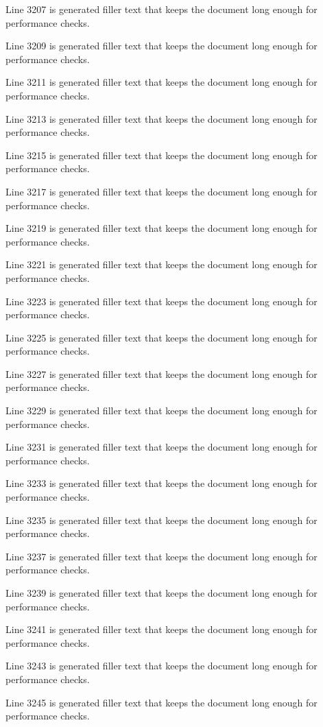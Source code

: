 Line 3207 is generated filler text that keeps the document long enough for performance checks.

Line 3209 is generated filler text that keeps the document long enough for performance checks.

Line 3211 is generated filler text that keeps the document long enough for performance checks.

Line 3213 is generated filler text that keeps the document long enough for performance checks.

Line 3215 is generated filler text that keeps the document long enough for performance checks.

Line 3217 is generated filler text that keeps the document long enough for performance checks.

Line 3219 is generated filler text that keeps the document long enough for performance checks.

Line 3221 is generated filler text that keeps the document long enough for performance checks.

Line 3223 is generated filler text that keeps the document long enough for performance checks.

Line 3225 is generated filler text that keeps the document long enough for performance checks.

Line 3227 is generated filler text that keeps the document long enough for performance checks.

Line 3229 is generated filler text that keeps the document long enough for performance checks.

Line 3231 is generated filler text that keeps the document long enough for performance checks.

Line 3233 is generated filler text that keeps the document long enough for performance checks.

Line 3235 is generated filler text that keeps the document long enough for performance checks.

Line 3237 is generated filler text that keeps the document long enough for performance checks.

Line 3239 is generated filler text that keeps the document long enough for performance checks.

Line 3241 is generated filler text that keeps the document long enough for performance checks.

Line 3243 is generated filler text that keeps the document long enough for performance checks.

Line 3245 is generated filler text that keeps the document long enough for performance checks.

